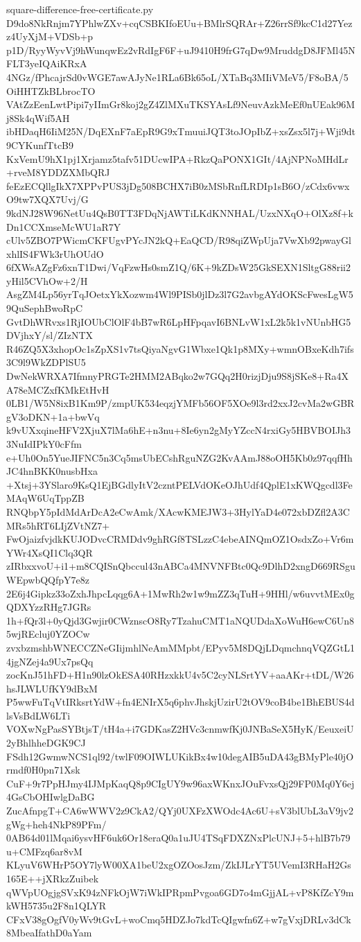 \documentclass[11pt]{article}
\theoremstyle{definition}
\theoremstyle{remark}
\begin{document}
\begin{filecontents*}[overwrite]{square-difference-free-certificate.py}
D9do8NkRnjm7YPhlwZXv+cqCSBKIfoEUu+BMlrSQRAr+Z26rrSf9kcC1d27Yezz4UyXjM+VDSb+p
p1D/RyyWyvVj9hWunqwEz2vRdIgF6F+uJ9410H9frG7qDw9MruddgD8JFMl45NFLT3yeIQAiKRxA
4NGz/fPhcajrSd0vWGE7awAJyNe1RLa6Bk65oL/XTaBq3MIiVMeV5/F8oBA/5OiHHTZkBLbrocTO
VAtZzEenLwtPipi7yIImGr8koj2gZ4ZlMXuTKSYAsLf9NeuvAzkMeEf0nUEak96Mj8Sk4qWif5AH
ibHDaqH6IiM25N/DqEXnF7aEpR9G9xTmuuiJQT3toJOpIbZ+xsZsx5l7j+Wji9dt9CYKunfTtcB9
KxVemU9hX1pj1Xrjamz5tafv51DUcwIPA+RkzQaPONX1GIt/4AjNPNoMHdLr+rveM8YDDZXMbQRJ
feEzECQllgIkX7XPPvPUS3jDg508BCHX7iB0zMSbRnfLRDIp1sB6O/zCdx6vwxO9tw7XQX7Uvj/G
9kdNJ28W96NetUu4QsB0TT3FDqNjAWTiLKdKNNHAL/UzxNXqO+OlXz8f+kDn1CCXmseMcWU1aR7Y
cUlv5ZBO7PWicmCKFUgvPYcJN2kQ+EaQCD/R98qiZWpUja7VwXb92pwayGlxhlIS4FWk3rUhOUdO
6fXWsAZgFz6xnT1Dwi/VqFzwHs0smZ1Q/6K+9kZDsW25GkSEXN1SltgG88rii2yHil5CVhOw+2/H
AsgZM4Lp56yrTqJOetxYkXozwm4Wl9PISb0jlDz3l7G2avbgAYdOKScFwesLgW59QuSephBwoRpC
GvtDhWRvxs1RjIOUbClOlF4bB7wR6LpHFpqavI6BNLvW1xL2k5k1vNUnbHG5DVjhxY/sl/ZIzNTX
R46ZQ5X3xhopOc1sZpXS1v7tsQiyaNgvG1Wbxe1Qk1p8MXy+wmnOBxeKdh7ifs3C9l9WkZDPlSU5
DwNekWRXA7IfmnyPRGTe2HMM2ABqko2w7GQq2H0rizjDju9S8jSKe8+Ra4XA78eMCZxfKMkEtHvH
0LB1/W5N8ixB1Km9P/zmpUK534eqzjYMFb56OF5XOe9l3rd2xxJ2cvMa2wGBRgV3oDKN+1a+bwVq
k9vUXxqineHFV2XjuX7lMa6hE+n3nu+8Ie6yn2gMyYZccN4rxiGy5HBVBOIJh33NuIdIPkY0cFfm
e+Uh0On5YueJIFNC5n3Cq5msUbECshRguNZG2KvAAmJ88oOH5Kb0z97qqfHhJC4hnBKK0nusbHxa
+Xtsj+3YSlaro9KsQ1EjBGdlyItV2czntPELVdOKeOJhUdf4QplE1xKWQgcdl3FeMAqW6UqTppZB
RNQbpY5pIdMdArDcA2eCwAmk/XAcwKMEJW3+3HylYaD4e072xbDZfl2A3CMRs5hRT6LIjZVtNZ7+
FwOjaizfvjdkKUJODvcCRMDdv9ghRGf8TSLzzC4ebeAINQmOZ1OsdxZo+Vr6mYWr4XsQI1Clq3QR
zIRbxxvoU+i1+m8CQISnQbccul43nABCa4MNVNFBtc0Qc9DlhD2xngD669RSguWEpwbQQfpY7e8z
2E6j4Gipkz33oZxhJhpcLqqg6A+1MwRh2w1w9mZZ3qTuH+9HHl/w6uvvtMEx0gQDXYzzRHg7JGRs
1h+fQr3l+0yQjd3Gwjir0CWznscO8Ry7TzahuCMT1aNQUDdaXoWuH6ewC6Un85wjREcluj0YZOCw
zvxbzmshbWNECCZNeGIijmhlNeAmMMpbt/EPyv5M8DQjLDqmchnqVQZGtL14jgNZej4a9Ux7psQq
zocKnJ51hFD+H1n90lzOkESA40RHzxkkU4v5C2cyNLSrtYV+aaAKr+tDL/W26hsJLWLUfKY9dBxM
P5wwFuTqVtIRksrtYdW+fn4ENIrX5q6phvJhskjUzirU2tOV9coB4be1BhEBUS4dlsVsBdLW6LTi
VOXwNgPasSYBtjsT/tH4a+i7GDKasZ2HVc3cnmwfKj0JNBaSeX5HyK/EeuxeiU2yBhlhheDGK9CJ
FSdh12GwmwNCS1ql92/twlF09OIWLUKikBx4w10degAIB5uDA43gBMyPle40jOrmdf0H0pn71Xsk
CuF+9r7PpHJmy4IJMpKaqQ8p9CIgUY9w96axWKnxJOuFvxsQj29FP0Mq0Y6ej4GsCbOHIwlgDaBG
ZucAfnpgT+CA6wWWV2z9CkA2/QYj0UXFzXWOdc4Ac6U+sV3blUbL3aV9jv2gWg+heh4NkP89PFm/
0AB64d01lMqai6ysvHF6uk6Or18eraQ0a1uJU4TSqFDXZNxPlcUNJ+5+hlB7b79u+CMFzq6ar8vM
KLyuV6WHrP5OY7lyW00XA1beU2xgOZOosJzm/ZkIJLrYT5UVemI3RHaH2Gs165E++jXRkzZuibek
qWVpUOgjgSVxK94zNFkOjW7iWkIPRpmPvgoa6GD7o4mGjjAL+vP8KfZcY9mkWH5735u2F8n1QLYR
CFxV38gOgfV0yWv9tGvL+woCmq5HDZJo7kdTcQIgwfn6Z+w7gVxjDRLv3dCk8MbeaIfathD0aYam

\end{filecontents*}
\end{document}
